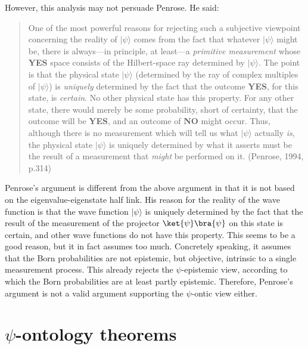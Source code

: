 However, this analysis may not persuade Penrose. He said:

\begin{quote}
One of the most powerful reasons for rejecting such a subjective
viewpoint concerning the reality of $|\psi\rangle$ comes from the
fact that whatever $|\psi\rangle$ might be, there is always---in
principle, at least---a {\it primitive measurement\/} whose {\bf YES}
space consists of the Hilbert-space ray determined by $|\psi\rangle$.
The point is that the physical state $|\psi\rangle$ (determined by
the ray of complex multiples of $|\psi\rangle$) is {\it uniquely\/}
determined by the fact that the outcome {\bf YES}, for this state, is
{\it certain}.  No other physical state has this property.  For any
other state, there would merely be some probability, short of
certainty, that the outcome will be {\bf YES}, and an outcome of {\bf
NO} might occur. Thus, although there is no measurement which will
tell us what $|\psi\rangle$ actually {\it is}, the physical state
$|\psi\rangle$ is uniquely determined by what it asserts must be the
result of a measurement that {\it might\/} be performed on it. (Penrose, 1994, p.314)
\end{quote}

Penrose's argument is different from the above argument in that it is not based on the eigenvalue-eigenstate half link. His reason for the reality of the wave function is that the wave function $|\psi\rangle$ is  uniquely determined by the fact that the result of the measurement of the projector $\ket{\psi}\bra{\psi}$ on this state is certain, and other wave functions do not have this property. 
This seems to be a good reason, but it in fact assumes too much. Concretely speaking, it assumes that the Born probabilities are not epistemic, but objective, intrinsic to a single measurement process. 
This already rejects the $\psi$-epistemic view, according to which the Born probabilities are at least partly epistemic. Therefore, Penrose's argument is not a valid argument supporting the $\psi$-ontic view either.

\section{$\psi$-ontology theorems}

